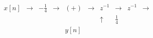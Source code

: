 \[
\begin{array}{cccccccccc}
x[n] & \longrightarrow & \boxed{-\frac{1}{4}} & \longrightarrow & (+) & \longrightarrow & z^{-1} & \longrightarrow & z^{-1} & \longrightarrow \\
      &                  &                    &                  &    &                  & \uparrow & \frac{1}{4} & \\
      &                  &                    &                  & y[n] &                 &         &
\end{array}
\]
